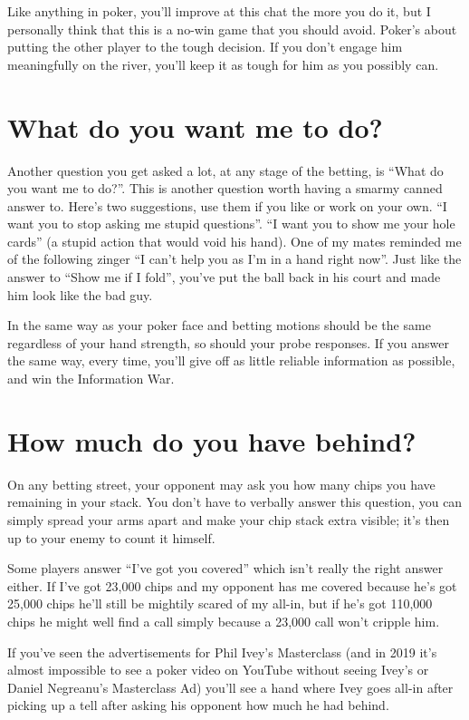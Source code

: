\begin{itemize}
    Like anything in poker, you'll improve at this chat the more you
    do it, but I personally think that this is a no-win game that you
    should avoid. Poker's about putting the other player to the tough
    decision. If you don't engage him meaningfully on the river,
    you'll keep it as tough for him as you possibly can.
    
\end{itemize}

\section{What do you want me to do?}

Another question you get asked a lot, at any stage of the betting, is
``What do you want me to do?''. This is another question worth having
a smarmy canned answer to. Here's two suggestions, use them if you
like or work on your own. ``I want you to stop asking me stupid
questions''. ``I want you to show me your hole cards'' (a stupid
action that would void his hand). One of my mates reminded
me of the following zinger ``I can't help you as I'm in a hand right
now''. Just like the answer to ``Show me if I fold'', you've put the
ball back in his court and made him look like the bad guy.

In the same way as your poker face and betting motions should be the
same regardless of your hand strength, so should your probe
responses. If you answer the same way, every time, you'll give off
as little reliable information as possible, and win the
Information War.

\section{How much do you have behind?}

On any betting street, your opponent may ask you how many chips
you have remaining in your stack. You don't have to verbally answer
this question, you can simply spread your arms apart and make your
chip stack extra visible; it's then up to your enemy to count it
himself.

Some players answer ``I've got you covered'' which isn't really the
right answer either. If I've got 23,000 chips and my opponent has me
covered because he's got 25,000 chips he'll still be mightily scared
of my all-in, but if he's got 110,000 chips he might well find a call
simply because a 23,000 call won't cripple him.

If you've seen the advertisements for Phil Ivey's Masterclass (and
in 2019 it's almost impossible to see a poker video on YouTube without
seeing Ivey's or Daniel Negreanu's Masterclass Ad) you'll see
a hand where Ivey goes all-in after picking up a tell after asking
his opponent how much he had behind.

